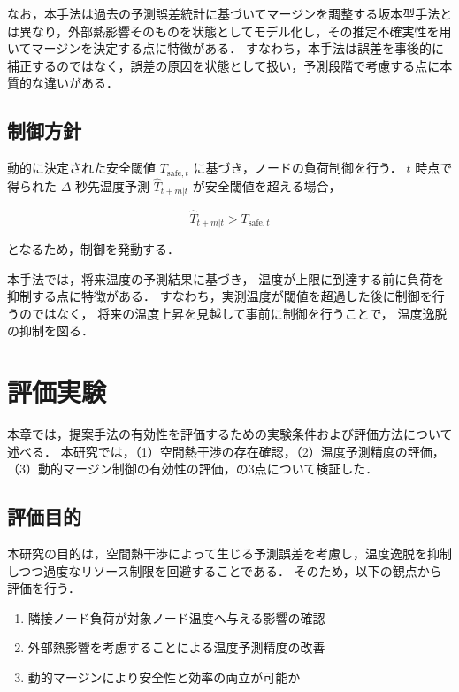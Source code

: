 \documentclass[techrep]{ipsj}
\begin{document}
なお，本手法は過去の予測誤差統計に基づいてマージンを調整する坂本型手法とは異なり，外部熱影響そのものを状態としてモデル化し，その推定不確実性を用いてマージンを決定する点に特徴がある．
すなわち，本手法は誤差を事後的に補正するのではなく，誤差の原因を状態として扱い，予測段階で考慮する点に本質的な違いがある．

\subsection{制御方針}

動的に決定された安全閾値 $T_{\mathrm{safe},t}$ に基づき，ノードの負荷制御を行う．
$t$ 時点で得られた $\Delta$ 秒先温度予測 $\hat{T}_{t+m|t}$ が安全閾値を超える場合，

\begin{equation}
\hat{T}_{t+m|t} > T_{\mathrm{safe},t}
\end{equation}

となるため，制御を発動する．

本手法では，将来温度の予測結果に基づき，
温度が上限に到達する前に負荷を抑制する点に特徴がある．
すなわち，実測温度が閾値を超過した後に制御を行うのではなく，
将来の温度上昇を見越して事前に制御を行うことで，
温度逸脱の抑制を図る．

\section{評価実験}

本章では，提案手法の有効性を評価するための実験条件および評価方法について述べる．
本研究では，（1）空間熱干渉の存在確認，（2）温度予測精度の評価，（3）動的マージン制御の有効性の評価，の3点について検証した．

\subsection{評価目的}

本研究の目的は，空間熱干渉によって生じる予測誤差を考慮し，温度逸脱を抑制しつつ過度なリソース制限を回避することである．
そのため，以下の観点から評価を行う．

\begin{enumerate}
    \item 隣接ノード負荷が対象ノード温度へ与える影響の確認
    \item 外部熱影響を考慮することによる温度予測精度の改善
    \item 動的マージンにより安全性と効率の両立が可能か
\end{enumerate}
\end{document}

